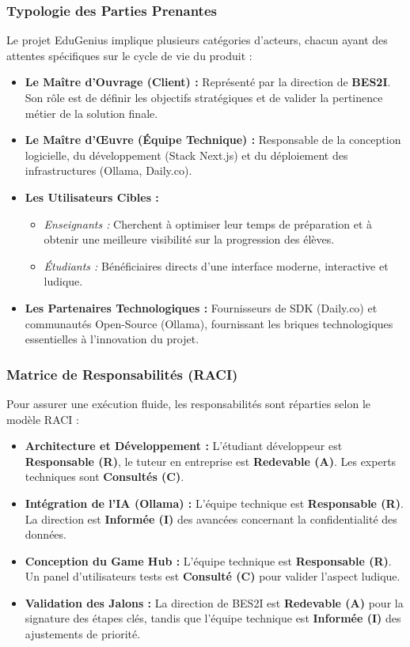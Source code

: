 \subsubsection{Typologie des Parties Prenantes}

Le projet EduGenius implique plusieurs catégories d'acteurs, chacun ayant des attentes spécifiques sur le cycle de vie du produit :

\begin{itemize}
\item \textbf{Le Maître d'Ouvrage (Client) :} Représenté par la direction de \textbf{BES2I}. Son rôle est de définir les objectifs stratégiques et de valider la pertinence métier de la solution finale.
\item \textbf{Le Maître d'Œuvre (Équipe Technique) :} Responsable de la conception logicielle, du développement (Stack Next.js) et du déploiement des infrastructures (Ollama, Daily.co).
\item \textbf{Les Utilisateurs Cibles :}
\begin{itemize}
\item \textit{Enseignants :} Cherchent à optimiser leur temps de préparation et à obtenir une meilleure visibilité sur la progression des élèves.
\item \textit{Étudiants :} Bénéficiaires directs d'une interface moderne, interactive et ludique.
\end{itemize}
\item \textbf{Les Partenaires Technologiques :} Fournisseurs de SDK (Daily.co) et communautés Open-Source (Ollama), fournissant les briques technologiques essentielles à l'innovation du projet.
\end{itemize}

\subsubsection{Matrice de Responsabilités (RACI)}

Pour assurer une exécution fluide, les responsabilités sont réparties selon le modèle RACI :

\begin{itemize}
\item \textbf{Architecture et Développement :} L'étudiant développeur est \textbf{Responsable (R)}, le tuteur en entreprise est \textbf{Redevable (A)}. Les experts techniques sont \textbf{Consultés (C)}.
\item \textbf{Intégration de l'IA (Ollama) :} L'équipe technique est \textbf{Responsable (R)}. La direction est \textbf{Informée (I)} des avancées concernant la confidentialité des données.
\item \textbf{Conception du Game Hub :} L'équipe technique est \textbf{Responsable (R)}. Un panel d'utilisateurs tests est \textbf{Consulté (C)} pour valider l'aspect ludique.
\item \textbf{Validation des Jalons :} La direction de BES2I est \textbf{Redevable (A)} pour la signature des étapes clés, tandis que l'équipe technique est \textbf{Informée (I)} des ajustements de priorité.
\end{itemize}

